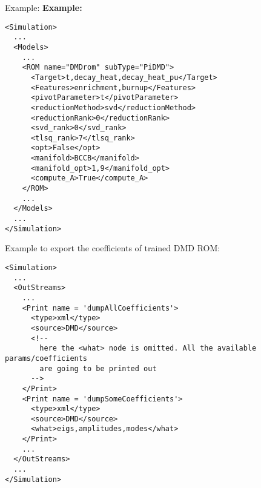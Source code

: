 \hspace{24pt}
Example:
\textbf{Example:}
\begin{lstlisting}[style=XML,morekeywords={name,subType}]
<Simulation>
  ...
  <Models>
    ...
    <ROM name="DMDrom" subType="PiDMD">
      <Target>t,decay_heat,decay_heat_pu</Target>
      <Features>enrichment,burnup</Features>
      <pivotParameter>t</pivotParameter>
      <reductionMethod>svd</reductionMethod>
      <reductionRank>0</reductionRank>
      <svd_rank>0</svd_rank>
      <tlsq_rank>7</tlsq_rank>
      <opt>False</opt>
      <manifold>BCCB</manifold>
      <manifold_opt>1,9</manifold_opt>
      <compute_A>True</compute_A>
    </ROM>
    ...
  </Models>
  ...
</Simulation>
\end{lstlisting}

Example to export the coefficients of trained DMD ROM:
\begin{lstlisting}[style=XML,morekeywords={name,subType}]
<Simulation>
  ...
  <OutStreams>
    ...
    <Print name = 'dumpAllCoefficients'>
      <type>xml</type>
      <source>DMD</source>
      <!--
        here the <what> node is omitted. All the available params/coefficients
        are going to be printed out
      -->
    </Print>
    <Print name = 'dumpSomeCoefficients'>
      <type>xml</type>
      <source>DMD</source>
      <what>eigs,amplitudes,modes</what>
    </Print>
    ...
  </OutStreams>
  ...
</Simulation>
\end{lstlisting}


